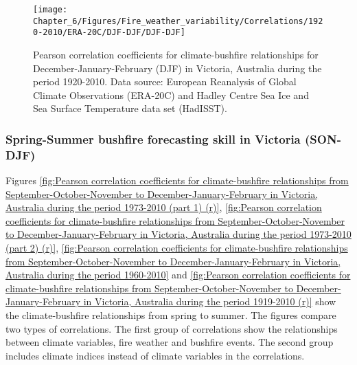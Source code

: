 \begin{figure}[h]
\noindent \begin{centering}
\texttt{[image: Chapter\_6/Figures/Fire\_weather\_variability/Correlations/1920-2010/ERA-20C/DJF-DJF/DJF-DJF]}
\par\end{centering}

\caption[Pearson correlation coefficients for climate-bushfire relationships
for December-January-February (DJF) in Victoria, Australia during
the period 1920-2010]{Pearson correlation coefficients for climate-bushfire relationships
for December-January-February (DJF) in Victoria, Australia during
the period 1920-2010. Data source: European Reanalysis of Global Climate
Observations (ERA-20C) and Hadley Centre Sea Ice and Sea Surface Temperature
data set (HadISST). \label{fig:Pearson correlation coefficients for climate-bushfire relationships for December-January-February in Victoria, Australia during the period 1920-2010 (r)}}
\end{figure}



\subsubsection{Spring-Summer bushfire forecasting skill in Victoria (SON-DJF)}

Figures \ref{fig:Pearson correlation coefficients for climate-bushfire relationships from September-October-November to December-January-February in Victoria, Australia during the period 1973-2010 (part 1) (r)},
\ref{fig:Pearson correlation coefficients for climate-bushfire relationships from September-October-November to December-January-February in Victoria, Australia during the period 1973-2010 (part 2) (r)},
\ref{fig:Pearson correlation coefficients for climate-bushfire relationships from September-October-November to December-January-February in Victoria, Australia during the period 1960-2010}
and \ref{fig:Pearson correlation coefficients for climate-bushfire relationships from September-October-November to December-January-February in Victoria, Australia during the period 1919-2010 (r)}
show the climate-bushfire relationships from spring to summer. The
figures compare two types of correlations. The first group of correlations
show the relationships between climate variables, fire weather and
bushfire events. The second group includes climate indices instead
of climate variables in the correlations.

